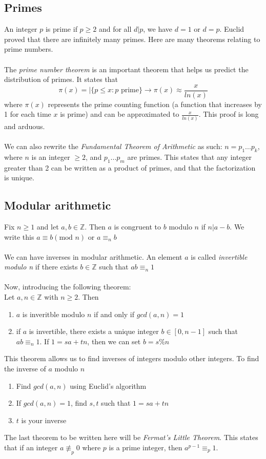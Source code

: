 \documentclass{article}
\begin{document}
\subsection{Primes}
An integer $p$ is prime if $p \ge 2$ and for all $d|p$, we have $d = 1$ or $d=p$. Euclid proved that there are infinitely many primes. Here are many theorems relating to prime numbers.
\\\\
The \textit{prime number theorem} is an important theorem that helps us predict the distribution of primes. It states that \[\pi(x) = |\{p\le x:p \text{ prime}\} \rightarrow \pi(x) \approx \frac{x}{ln(x)}\] where $\pi(x)$ represents the prime counting function (a function that increases by 1 for each time $x$ is prime) and can be approximated to $\frac{x}{ln(x)}$. This proof is long and arduous.
\\\\
We can also rewrite the \textit{Fundamental Theorem of Arithmetic} as such: $n =p_1...p_k$, where $n$ is an integer $\ge 2$, and $p_1...p_m$ are primes. This states that any integer greater than 2 can be written as a product of primes, and that the factorization is unique.

\subsection{Modular arithmetic}
Fix $n\ge 1$ and let $a,b \in \mathds{Z}$. Then $a$ is congruent to $b$ modulo $n$ if $n|a-b$. We write this $a\equiv b (\text{mod }n)$ or $a\equiv_n b$
\\\\
We can have inverses in modular arithmetic. An element $a$ is called \textit{invertible modulo n} if there exists $b\in \mathds{Z}$ such that $ab \equiv_n 1$
\\\\
Now, introducing the following theorem:\\
Let $a,n\in\mathds{Z}$ with $n\ge 2$. Then \begin{enumerate}
    \item $a$ is inveritble modulo $n$ if and only if $gcd(a,n) = 1$
    \item if $a$ is invertible, there exists a unique integer $b \in [0,n-1]$ such that $ab \equiv_n 1$. If $1=sa+tn$, then we can set $b=s \% n$ 
\end{enumerate}
This theorem allows us to find inverses of integers modulo other integers. To find the inverse of $a$ modulo $n$
\begin{enumerate}
    \item Find $gcd(a,n)$ using Euclid's algorithm
    \item If $gcd(a,n) = 1$, find $s,t$ such that $1 = sa+tn$
    \item $t$ is your inverse
\end{enumerate}
The last theorem to be written here will be \textit{Fermat's Little Theorem}. This states that if an integer $a\not\equiv_p 0$ where $p$ is a prime integer, then $a^{p-1} \equiv_p 1$.
\end{document}
